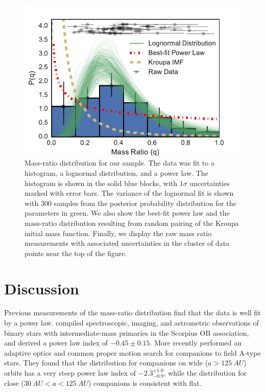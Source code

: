 \documentclass{emulateapj}
\begin{document}
\begin{figure}
\includegraphics[width=\columnwidth]{MRD_total.pdf}
\caption{Mass-ratio distribution for our sample. The data was fit to a histogram, a lognormal distribution, and a power law. The histogram is shown in the solid blue blocks, with $1 \sigma$ uncertainties marked with error bars. The variance of the lognormal  fit is shown with 300 samples from the posterior probability distribution for the parameters in green. We also show the best-fit power law and the mass-ratio distribution resulting from random pairing of the Kroupa initial mass function. Finally, we display the raw mass ratio measurements with associated uncertainties in the cluster of data points near the top of the figure.}
\label{fig:mrd}
\end{figure}




\section{Discussion}
\label{sec:discussion}

Previous measurements of the mass-ratio distribution find that the data is well fit by a power law. \citet{Kouwenhoven2007} compiled spectroscopic, imaging, and astrometric observations of binary stars with intermediate-mass primaries in the Scorpius OB association, and derived a power law index of  $-0.45 \pm 0.15$. More recently \citet{DeRosa2014} performed an adaptive optics and common proper motion search for companions to field A-type stars. They found that the distribution for companions on wide ($a > 125\ AU$) orbits has a very steep power law index of $-2.3^{+1.0}_{-0.9}$, while the distribution for close ($30\ AU < a < 125\ AU$) companions is consistent with flat.
\end{document}
